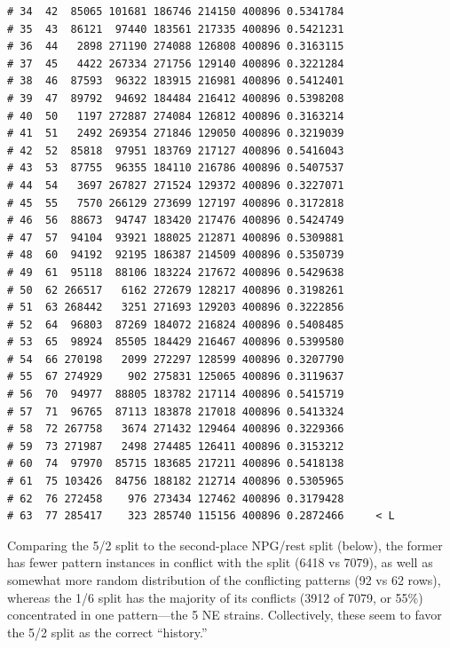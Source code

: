 \documentclass{article}\usepackage[]{graphicx}\usepackage[]{color}
\makeatletter
\newenvironment{kframe}{%
 \def\at@end@of@kframe{}%
 \ifinner\ifhmode%
  \def\at@end@of@kframe{\end{minipage}}%
  \begin{minipage}{\columnwidth}%
 \fi\fi%
 \def\FrameCommand##1{\hskip\@totalleftmargin \hskip-\fboxsep
 \colorbox{shadecolor}{##1}\hskip-\fboxsep
     \hskip-\linewidth \hskip-\@totalleftmargin \hskip\columnwidth}%
 \MakeFramed {\advance\hsize-\width
   \@totalleftmargin\z@ \linewidth\hsize
   \@setminipage}}%
 {\par\unskip\endMakeFramed%
 \at@end@of@kframe}
\newenvironment{knitrout}{}{} %
\makeatother
\begin{document}
\begin{knitrout}
\begin{kframe}
\begin{verbatim}
# 34  42  85065 101681 186746 214150 400896 0.5341784        
# 35  43  86121  97440 183561 217335 400896 0.5421231        
# 36  44   2898 271190 274088 126808 400896 0.3163115        
# 37  45   4422 267334 271756 129140 400896 0.3221284        
# 38  46  87593  96322 183915 216981 400896 0.5412401        
# 39  47  89792  94692 184484 216412 400896 0.5398208        
# 40  50   1197 272887 274084 126812 400896 0.3163214        
# 41  51   2492 269354 271846 129050 400896 0.3219039        
# 42  52  85818  97951 183769 217127 400896 0.5416043        
# 43  53  87755  96355 184110 216786 400896 0.5407537        
# 44  54   3697 267827 271524 129372 400896 0.3227071        
# 45  55   7570 266129 273699 127197 400896 0.3172818        
# 46  56  88673  94747 183420 217476 400896 0.5424749        
# 47  57  94104  93921 188025 212871 400896 0.5309881        
# 48  60  94192  92195 186387 214509 400896 0.5350739        
# 49  61  95118  88106 183224 217672 400896 0.5429638        
# 50  62 266517   6162 272679 128217 400896 0.3198261        
# 51  63 268442   3251 271693 129203 400896 0.3222856        
# 52  64  96803  87269 184072 216824 400896 0.5408485        
# 53  65  98924  85505 184429 216467 400896 0.5399580        
# 54  66 270198   2099 272297 128599 400896 0.3207790        
# 55  67 274929    902 275831 125065 400896 0.3119637        
# 56  70  94977  88805 183782 217114 400896 0.5415719        
# 57  71  96765  87113 183878 217018 400896 0.5413324        
# 58  72 267758   3674 271432 129464 400896 0.3229366        
# 59  73 271987   2498 274485 126411 400896 0.3153212        
# 60  74  97970  85715 183685 217211 400896 0.5418138        
# 61  75 103426  84756 188182 212714 400896 0.5305965        
# 62  76 272458    976 273434 127462 400896 0.3179428        
# 63  77 285417    323 285740 115156 400896 0.2872466     < L
\end{verbatim}
\end{kframe}
\end{knitrout}

Comparing the 5/2 split to the second-place NPG/rest split (below), the former has fewer pattern instances in conflict
with the split (6418 vs 7079), as well as somewhat more random distribution of the conflicting patterns (92 vs 62 rows),
whereas the 1/6 split has the majority of its conflicts (3912 of 7079, or 55\%) concentrated in one pattern---the 5 NE
strains.  Collectively, these seem to favor the 5/2 split as the correct ``history.''
\end{document}
